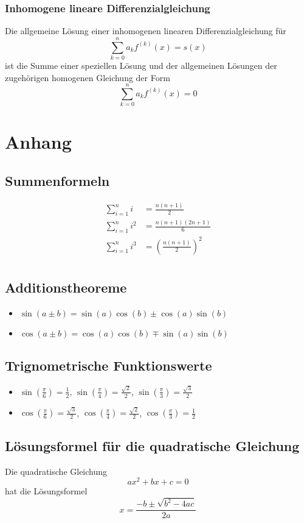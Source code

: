 \subsubsection{Inhomogene lineare Differenzialgleichung}
Die allgemeine Lösung einer inhomogenen linearen Differenzialgleichung
für
\[ \sum_{k=0}^{n} a_{k}f^{(k)}(x) = s(x) \]
ist die Summe einer speziellen Lösung  und  der allgemeinen
Lösungen der zugehörigen homogenen Gleichung der Form
\[ \sum_{k=0}^{n} a_{k}f^{(k)}(x) = 0 \]

\section{Anhang}
\subsection{Summenformeln}
\[ \begin{aligned}
  \sum_{i=1}^{n}i     & = \frac{n(n+1)}{2} \\
  \sum_{i=1}^{n}i^2   & = \frac{n(n+1)(2n+1)}{6} \\
  \sum_{i=1}^{n}i^3   & = \left(\frac{n(n+1)}{2}\right)^2 \\
\end{aligned} \]
\subsection{Additionstheoreme}
\begin{itemize}
  \item $\sin(a \pm b) = \sin(a) \cos(b) \pm \cos(a) \sin(b)$
  \item $\cos(a \pm b) = \cos(a) \cos(b) \mp \sin(a) \sin(b)$
\end{itemize}
\subsection{Trignometrische Funktionswerte}
\begin{itemize}
  \item $\sin(\frac{\pi}{6}) = \frac{1}{2}$,
        $\sin(\frac{\pi}{4}) = \frac{\sqrt{2}}{2}$,
        $\sin(\frac{\pi}{3}) = \frac{\sqrt{3}}{2}$
  \item $\cos(\frac{\pi}{6}) = \frac{\sqrt{3}}{2}$,
        $\cos(\frac{\pi}{4}) = \frac{\sqrt{2}}{2}$,
        $\cos(\frac{\pi}{3}) = \frac{1}{2}$
\end{itemize}
\subsection{Lösungsformel für die quadratische Gleichung}
Die quadratische Gleichung
\[ ax^2 + bx + c = 0 \]
hat die Lösungsformel
\[ x = \frac{-b \pm \sqrt{b^2 - 4ac}}{2a} \]
